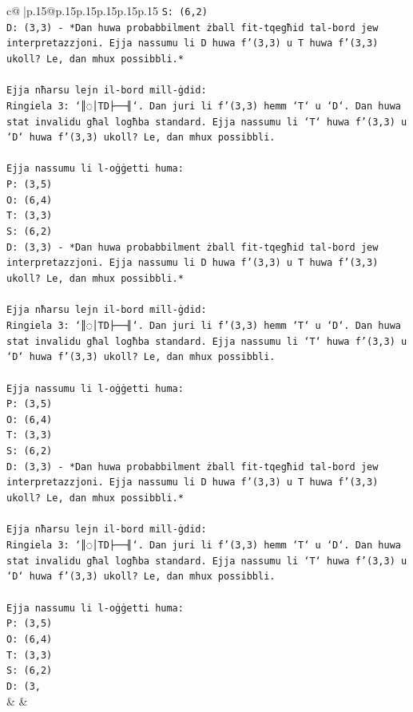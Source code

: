 \documentclass{article}
\begin{document}
{\begin{supertabular}{c@{$\;$}|p{.15\linewidth}@{}p{.15\linewidth}p{.15\linewidth}p{.15\linewidth}p{.15\linewidth}p{.15\linewidth}}
{{{\texttt{S: (6,2)} \\
\texttt{D: (3,3) {-} *Dan huwa probabbilment żball fit{-}tqegħid tal{-}bord jew interpretazzjoni. Ejja nassumu li D huwa f'(3,3) u T huwa f'(3,3) ukoll? Le, dan mhux possibbli.*} \\
\\ 
\texttt{Ejja nħarsu lejn il{-}bord mill{-}ġdid:} \\
\texttt{Ringiela 3: `║◌│TD├──╢`. Dan juri li f'(3,3) hemm `T` u `D`. Dan huwa stat invalidu għal logħba standard. Ejja nassumu li `T` huwa f'(3,3) u `D` huwa f'(3,3) ukoll? Le, dan mhux possibbli.} \\
\\ 
\texttt{Ejja nassumu li l{-}oġġetti huma:} \\
\texttt{P: (3,5)} \\
\texttt{O: (6,4)} \\
\texttt{T: (3,3)} \\
\texttt{S: (6,2)} \\
\texttt{D: (3,3) {-} *Dan huwa probabbilment żball fit{-}tqegħid tal{-}bord jew interpretazzjoni. Ejja nassumu li D huwa f'(3,3) u T huwa f'(3,3) ukoll? Le, dan mhux possibbli.*} \\
\\ 
\texttt{Ejja nħarsu lejn il{-}bord mill{-}ġdid:} \\
\texttt{Ringiela 3: `║◌│TD├──╢`. Dan juri li f'(3,3) hemm `T` u `D`. Dan huwa stat invalidu għal logħba standard. Ejja nassumu li `T` huwa f'(3,3) u `D` huwa f'(3,3) ukoll? Le, dan mhux possibbli.} \\
\\ 
\texttt{Ejja nassumu li l{-}oġġetti huma:} \\
\texttt{P: (3,5)} \\
\texttt{O: (6,4)} \\
\texttt{T: (3,3)} \\
\texttt{S: (6,2)} \\
\texttt{D: (3,3) {-} *Dan huwa probabbilment żball fit{-}tqegħid tal{-}bord jew interpretazzjoni. Ejja nassumu li D huwa f'(3,3) u T huwa f'(3,3) ukoll? Le, dan mhux possibbli.*} \\
\\ 
\texttt{Ejja nħarsu lejn il{-}bord mill{-}ġdid:} \\
\texttt{Ringiela 3: `║◌│TD├──╢`. Dan juri li f'(3,3) hemm `T` u `D`. Dan huwa stat invalidu għal logħba standard. Ejja nassumu li `T` huwa f'(3,3) u `D` huwa f'(3,3) ukoll? Le, dan mhux possibbli.} \\
\\ 
\texttt{Ejja nassumu li l{-}oġġetti huma:} \\
\texttt{P: (3,5)} \\
\texttt{O: (6,4)} \\
\texttt{T: (3,3)} \\
\texttt{S: (6,2)} \\
\texttt{D: (3,} \\
            }
        }
    }
    & & \\ \\


\end{supertabular}}
\end{document}
